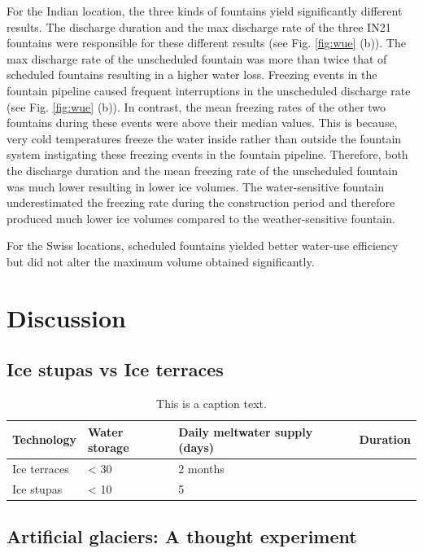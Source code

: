For the Indian location, the three kinds of fountains yield significantly different results.  The discharge
duration and the max discharge rate of the three IN21 fountains were responsible for these different results
(see Fig. \ref{fig:wue} (b)). The max discharge rate of the unscheduled fountain was more than twice that of
scheduled fountains resulting in a higher water loss. Freezing events in the fountain pipeline caused frequent
interruptions in the unscheduled discharge rate (see Fig. \ref{fig:wue} (b)). In contrast, the mean freezing
rates of the other two fountains during these events were above their median values. This is because, very cold
temperatures freeze the water inside rather than outside the fountain system instigating these freezing events in
the fountain pipeline. Therefore, both the discharge duration and the mean freezing rate of the unscheduled
fountain was much lower resulting in lower ice volumes. The water-sensitive fountain underestimated the freezing
rate during the construction period and therefore produced much lower ice volumes compared to the
weather-sensitive fountain. 

For the Swiss locations, scheduled fountains yielded better water-use efficiency but did not alter the maximum
volume obtained significantly. 


\section{Discussion}
\subsection{Ice stupas vs Ice terraces}

\begin{table}[htb]
	\begin{tabularx}{\textwidth}{X | X | X | X}
		\hline
    \textbf{Technology}& \textbf{Water storage}& \textbf{Daily meltwater supply (days)}& \textbf{Duration} \\
    \hline
		Ice terraces			& < 30				     & 2 months				\\
    Ice stupas        & < 10             & 5				\\
		\hline
	\end{tabularx}
	\label{tab:table1}
	\caption{This is a caption text.}
\end{table}

\subsection{Artificial glaciers: A thought experiment}

